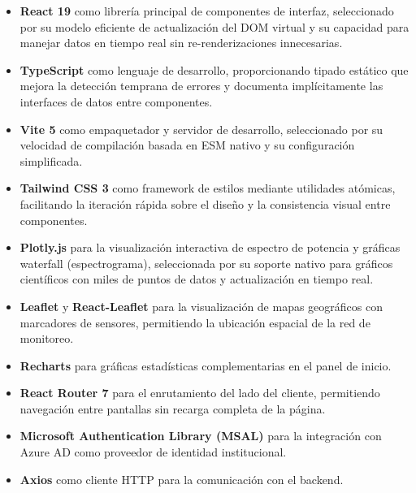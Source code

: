 \begin{itemize}
    \item \textbf{React 19} como librería principal de componentes de interfaz,
    seleccionado por su modelo eficiente de actualización del DOM virtual y su
    capacidad para manejar datos en tiempo real sin re-renderizaciones
    innecesarias.

    \item \textbf{TypeScript} como lenguaje de desarrollo, proporcionando
    tipado estático que mejora la detección temprana de errores y documenta
    implícitamente las interfaces de datos entre componentes.

    \item \textbf{Vite 5} como empaquetador y servidor de desarrollo,
    seleccionado por su velocidad de compilación basada en ESM nativo y su
    configuración simplificada.

    \item \textbf{Tailwind CSS 3} como framework de estilos mediante
    utilidades atómicas, facilitando la iteración rápida sobre el diseño y la
    consistencia visual entre componentes.

    \item \textbf{Plotly.js} para la visualización interactiva de espectro de
    potencia y gráficas waterfall (espectrograma), seleccionada por su soporte
    nativo para gráficos científicos con miles de puntos de datos y
    actualización en tiempo real.

    \item \textbf{Leaflet} y \textbf{React-Leaflet} para la visualización de
    mapas geográficos con marcadores de sensores, permitiendo la ubicación
    espacial de la red de monitoreo.

    \item \textbf{Recharts} para gráficas estadísticas complementarias en el
    panel de inicio.

    \item \textbf{React Router 7} para el enrutamiento del lado del cliente,
    permitiendo navegación entre pantallas sin recarga completa de la página.

    \item \textbf{Microsoft Authentication Library (MSAL)} para la integración
    con Azure AD como proveedor de identidad institucional.

    \item \textbf{Axios} como cliente HTTP para la comunicación con el backend.
\end{itemize}

